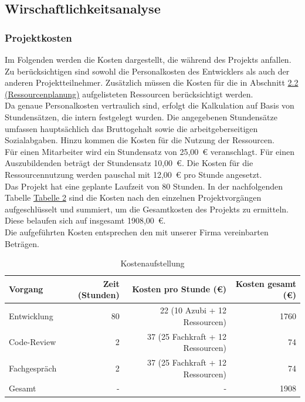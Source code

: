 \documentclass[a4paper,12pt]{article}
\begin{document}
\subsection{Wirschaftlichkeitsanalyse}
\subsubsection{Projektkosten}
Im Folgenden werden die Kosten dargestellt, die während des Projekts anfallen. Zu berücksichtigen sind sowohl die Personalkosten des Entwicklers als auch der anderen Projektteilnehmer. Zusätzlich müssen die Kosten für die in Abschnitt \hyperref[sec:ressourcenplanung]{2.2 (Ressourcenplanung)} aufgelisteten Ressourcen berücksichtigt werden.\\
Da genaue Personalkosten vertraulich sind, erfolgt die Kalkulation auf Basis von Stundensätzen, die intern festgelegt wurden. Die angegebenen Stundensätze umfassen hauptsächlich das Bruttogehalt sowie die arbeitgeberseitigen Sozialabgaben. Hinzu kommen die Kosten für die Nutzung der Ressourcen.\\
Für einen Mitarbeiter wird ein Stundensatz von 25,00~€ veranschlagt. Für einen Auszubildenden beträgt der Stundensatz 10,00~€. Die Kosten für die Ressourcennutzung werden pauschal mit 12,00~€ pro Stunde angesetzt.\\
Das Projekt hat eine geplante Laufzeit von 80 Stunden. In der nachfolgenden Tabelle \hyperlink{Kostenaufstellung}{Tabelle 2} sind die Kosten nach den einzelnen Projektvorgängen aufgeschlüsselt und summiert, um die Gesamtkosten des Projekts zu ermitteln. Diese belaufen sich auf insgesamt 1908,00~€.\\
Die aufgeführten Kosten entsprechen den mit unserer Firma vereinbarten Beträgen.

\hypertarget{Kostenaufstellung}{}
\begin{table}[h]
\centering
\begin{tabular}{|l|r|r|r|}
\hline
\rowcolor{gray}
\textbf{Vorgang} & \textbf{Zeit (Stunden)} & \textbf{Kosten pro Stunde (€)} & \textbf{Kosten gesamt (€)} \\
\hline
Entwicklung & 80 & 22 (10 Azubi + 12 Ressourcen) & 1760 \\
\hline
Code-Review & 2 & 37 (25 Fachkraft + 12 Ressourcen) & 74 \\
\hline
Fachgespräch & 2 & 37 (25 Fachkraft + 12 Ressourcen) & 74 \\
\hline
\hline
Gesamt & - & - & 1908 \\
\hline
\end{tabular}
\caption{Kostenaufstellung}
\label{tab:Kostenaufstellung}
\end{table}
\end{document}
